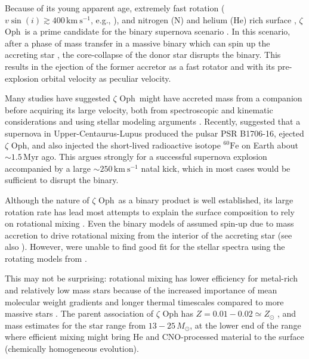 \documentclass[twocolumn,twocolappendix,trackchanges]{aastex63}
\newcommand{\kms}{{\mathrm{km\ s^{-1}}}}
\newcommand{\zoph}{$\zeta$ Oph}
\begin{document}
Because of its young apparent age, extremely fast rotation
($v\sin(i)\gtrsim 400\,\kms$, e.g., \citealt{zehe:18}), and nitrogen
(N) and helium (He) rich surface \citep[e.g.,][]{herrero:92,
  blaauw:93, villamariz:05, marcolino:09}, \zoph\ is a prime candidate
for the binary supernova scenario \citep{blaauw:61, renzo:19walk}. In
this scenario, after a phase of mass transfer in a massive binary
which can spin up the accreting star \citep[e.g.,][]{packet:81}, the
core-collapse of the donor star disrupts the binary. This results in
the ejection of the former accretor as a fast rotator and with its
pre-explosion orbital velocity as peculiar velocity.

Many studies have suggested \zoph\ might have accreted mass from a
companion before acquiring its large velocity, both from spectroscopic
and kinematic considerations \citep[e.g.,][]{blaauw:93, hoogerwerf:00,
  hoogerwerf:01, tetzlaff:10, neuhauser:20} and using stellar modeling
arguments \citep[e.g.,][]{vanrensbergen:96}. Recently,
\cite{neuhauser:20} suggested that a supernova in
Upper-Centaurus-Lupus produced the pulsar PSR B1706-16, ejected \zoph,
and also injected the short-lived radioactive isotope
$^{60}\mathrm{Fe}$ on Earth about $\sim 1.5$\,Myr ago. This argues
strongly for a successful supernova explosion accompanied by a large
$\sim 250\,\kms$ natal kick, which in most cases would be sufficient
to disrupt the binary.

Although the nature of \zoph\ as a binary product is well
established, its large rotation rate has lead most attempts to explain
the surface composition to rely on rotational mixing
\cite[e.g.,][]{maeder:00}. Even the binary models of
\cite{vanrensbergen:96} assumed spin-up due to mass accretion
\citep[e.g.,][]{packet:81} to drive rotational mixing from the
interior of the accreting star (see also
\citealt{cantiello:07}). However, \cite{villamariz:05} were unable to
find good fit for the stellar spectra using the rotating models from
\cite{meynet:00}.

This may not be surprising: rotational mixing has
lower efficiency for metal-rich and relatively low mass stars because
of the increased importance of mean molecular weight gradients and
longer thermal timescales compared to more massive stars
\citep[e.g.,][]{yoon:06, perna:14}. The parent association of $\zeta$
Oph has $Z=0.01-0.02\simeq Z_\odot$ \citep[e.g.,][]{murphy:21}, and
mass estimates for the star range from $13-25\,M_\odot$, at the
lower end of the range where efficient mixing might bring He and
CNO-processed material to the surface (chemically homogeneous
evolution).
\end{document}

